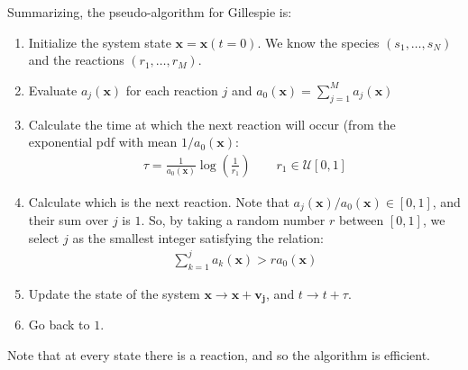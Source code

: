 \documentclass[../template.tex]{subfiles}
\begin{document}
Summarizing, the pseudo-algorithm for Gillespie is:
\begin{enumerate}
    \item Initialize the system state $\bm{x} = \bm{x}(t=0)$. We know the species $(s_1, \dots, s_N)$ and the reactions $(r_1, \dots, r_M)$.
    \item Evaluate $a_j(\bm{x})$ for each reaction $j$ and $a_0(\bm{x}) = \sum_{j=1}^M a_j(\bm{x})$
    \item Calculate the time at which the next reaction will occur (from the exponential pdf with mean $1/a_0(\bm{x})$:
    \begin{align*}
        \tau = \frac{1}{a_0(\bm{x})}  \log\left(\frac{1}{r_1} \right) \qquad r_1 \in \mathcal{U}[0,1]
    \end{align*}
    \item Calculate which is the next reaction. Note that $a_j(\bm{x})/a_0(\bm{x}) \in [0,1]$, and their sum over $j$ is $1$. So, by taking a random number $r$ between $[0,1]$, we select $j$ as the smallest integer satisfying the relation:
    \begin{align*}
        \sum_{k=1}^j a_k(\bm{x}) > r a_0(\bm{x})
    \end{align*}
    \item Update the state of the system $\bm{x} \to \bm{x} + \bm{v_j}$, and $t \to t+ \tau$.
    \item Go back to $1$.
\end{enumerate}

Note that at every state there is a reaction, and so the algorithm is efficient. 
\end{document}
